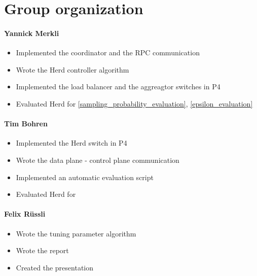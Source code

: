 \documentclass[11pt,oneside,a4paper]{article}
\begin{document}
\label{lastpage} %
\clearpage
{}



\clearpage
\appendix
{}

\section{Group organization}

\paragraph{Yannick Merkli}
\begin{itemize}
	\item Implemented the coordinator and the RPC communication
	\item Wrote the Herd controller algorithm
	\item Implemented the load balancer and the aggreagtor switches in P4
	\item Evaluated Herd for \ref{sampling_probability_evaluation}, \ref{epsilon_evaluation}
\end{itemize}


\paragraph{Tim Bohren}
\begin{itemize}
	\item Implemented the Herd switch in P4
	\item Wrote the data plane - control plane communication
	\item Implemented an automatic evaluation script
	\item Evaluated Herd for
\end{itemize}

\paragraph{Felix Rüssli}
\begin{itemize}
	\item Wrote the tuning parameter algorithm
	\item Wrote the report
	\item Created the presentation
\end{itemize}
\end{document}
